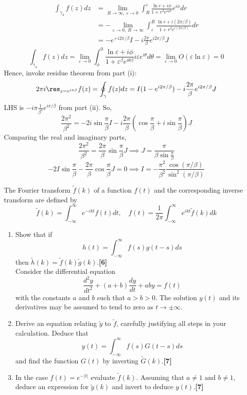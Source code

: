 \documentclass[a4paper]{article}
\begin{document}
\begin{ans}
\begin{enumerate}[label=(\roman*)]
\begin{align}
\int_{\gamma_3}f(z)dz&=\lim_{R\rightarrow\infty,~\varepsilon\rightarrow 0}\int_R^\varepsilon\frac{\ln r+i\phi}{1+r^\beta e^{i\phi\beta}}e^{i\phi}dr\nonumber\\&=-\lim_{\varepsilon\rightarrow 0,~R\rightarrow\infty}\int_{\varepsilon}^R\frac{\ln r+i(2\pi/\beta)}{1+r^\beta e^{i(2\pi/\beta)}}dr\nonumber\\&=-e^{+i2\pi/\beta}I-i\frac{2\pi}{\beta}e^{i2\pi/\beta}J\nonumber
\end{align}
$$\int_{\gamma_4}f(z)dz=\lim_{\varepsilon\rightarrow 0}\int_\phi^0\frac{\ln\varepsilon+i\phi}{1+\varepsilon^\beta e^{i\theta\beta}}i\varepsilon e^{i\theta}d\theta=\lim_{\varepsilon\rightarrow 0}O(\varepsilon\ln\varepsilon)=0$$
Hence, invoke residue theorem from part (i):
$$2\pi i\res_{z=e^{i\pi\beta}}f(z)=\oint_\gamma f(z)dz=I(1-e^{i2\pi/\beta})-i\frac{2\pi}{\beta}e^{i2\pi/\beta}J$$
LHS is $-i\pi\frac{1}{\beta^2}e^{i\pi/\beta}$ from part (ii). So,
$$\frac{2\pi^2}{\beta^2}=-2i\sin\frac{\pi}{\beta}I-i\frac{2\pi}{\beta}(\cos\frac{\pi}{\beta}+i\sin\frac{\pi}{\beta})J$$
Comparing the real and imaginary parts,
$$\frac{2\pi^2}{\beta^2}=\frac{2\pi}{\beta}\sin\frac{\pi}{\beta}J\implies J=\frac{\pi}{\beta\sin\frac{\pi}{\beta}}$$
$$-2I\sin\frac{\pi}{\beta}-\frac{2\pi}{\beta}\cos\frac{\pi}{\beta}J=0\implies I=-\frac{\pi^2}{\beta^2}\frac{\cos(\pi/\beta)}{\sin^2(\pi/\beta)}$$
\end{enumerate}
\end{ans}
\newpage
\begin{qns}
The Fourier transform $\tilde{f}(k)$ of a function $f(t)$ and the corresponding inverse transform are defined by
$$\tilde{f}(k)=\int_{-\infty}^\infty e^{-ikt}f(t)dt,\quad f(t)=\frac{1}{2\pi}\int_{-\infty}^\infty e^{ikt}\tilde{f}(k)dk$$
\begin{enumerate}[label=(\roman*)]
\item Show that if
$$h(t)=\int_{-\infty}^\infty f(s)g(t-s)ds$$
then $\tilde{h}(k)=\tilde{f}(k)\tilde{g}(k)$.\hfill\textbf{[6]}\\[5pt]
Consider the differential equation
$$\frac{d^2y}{dt^2}+(a+b)\frac{dy}{dt}+aby=f(t)$$
with the constants $a$ and $b$ such that $a > b > 0$. The solution $y(t)$ and its derivatives may be assumed to tend to zero as $t\rightarrow\pm\infty$.
\item Derive an equation relating $\tilde{y}$ to $\tilde{f}$, carefully justifying all steps in your calculation. Deduce that
$$y(t)=\int_{-\infty}^\infty f(s)G(t-s)ds$$
and find the function $G(t)$ by inverting $\tilde{G}(k)$.\hfill\textbf{[7]}
\item In the case $f(t) = e^{−|t|}$ evaluate $\tilde{f}(k)$. Assuming that $a\neq1$ and $b\neq1$, deduce an expression for $\tilde{y}(k)$ and invert to deduce $y(t)$.\hfill\textbf{[7]}
\end{enumerate}
\end{qns}
\end{document}
